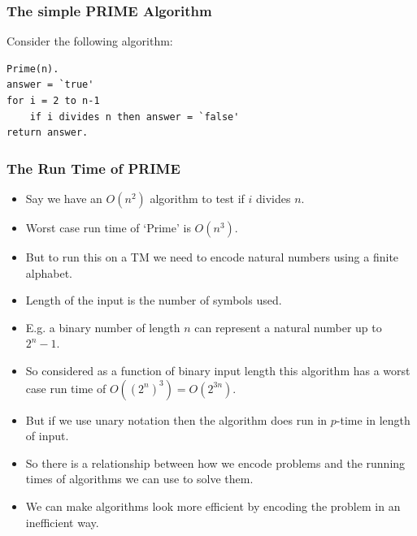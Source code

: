 \documentclass[handout]{beamer}
\begin{document}
\begin{frame}[fragile]
\frametitle{The simple PRIME Algorithm}
Consider the following algorithm:
\begin{verbatim}
Prime(n).
answer = `true'
for i = 2 to n-1
	if i divides n then answer = `false'
return answer.	
\end{verbatim} 

\end{frame}

\begin{frame}
\frametitle{The Run Time of PRIME}
\begin{itemize}
\item Say we have an $O(n^2)$ algorithm to test if $i$ divides $n$. 
\item Worst case run time of `Prime' is $O(n^3)$. 
\item But to run this on a TM we need to encode natural numbers using a finite alphabet.
\item Length of the input is the number of symbols used.
\item E.g. a binary number of length $n$ can represent a natural number up to $2^n-1$. 
\item So considered as a function of binary input length this algorithm has a worst case run time of $O((2^n)^3)=O(2^{3n})$.
\item But if we use unary notation then the algorithm does run in $p$-time in length of input. 
\item So there is a relationship between how we encode problems and the running times of algorithms we can use to solve them. 
\item We can make algorithms look more efficient by encoding the problem in an inefficient way.
\end{itemize}
\end{frame}
\end{document}

